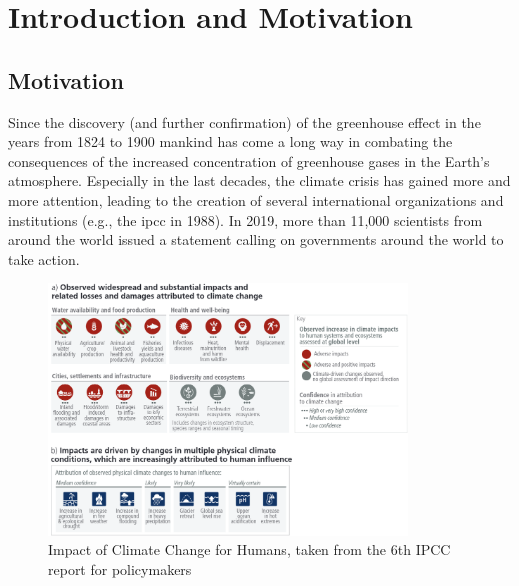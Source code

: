 \chapter{Introduction and Motivation}
\label{ch:intro}


\section{Motivation}
\label{sec:motivation}


Since the discovery (and further confirmation) of the greenhouse effect in the years from 1824 to 1900 \cite{fourier1824remarques, foote1856circumstances} mankind has come a long way in combating the consequences of the increased concentration of greenhouse gases in the Earth's atmosphere. 
Especially in the last decades, the climate crisis has gained more and more attention, leading to the creation of several international organizations and institutions (e.g., the \ac{ipcc} in 1988).
In 2019, more than 11,000 scientists from around the world issued a statement \cite{ripple_world_2019} calling on governments around the world to take action.




\begin{figure}[hbt]
  \begin{center}
    \includegraphics[width=0.85\textwidth]{figures/ipcc_6th_report_impacts_climate_change.png}
  \end{center}
  \caption{Impact of Climate Change for Humans, taken from the 6th IPCC report for policymakers \cite{lee2024climate}}
  \label{fig:impacts_climate_change}
\end{figure}



